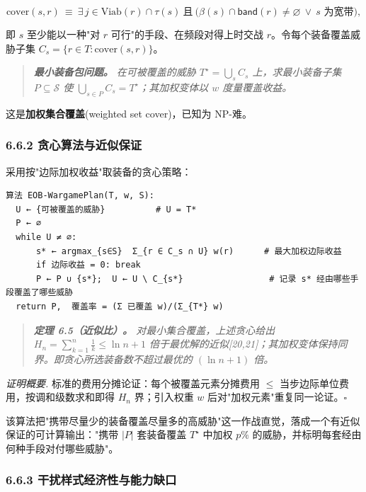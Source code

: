 \documentclass[12pt,a4paper]{ctexart}
\begin{document}
\[\mathrm{cover}(s,r)\ \equiv\ \exists\, j\in\mathrm{Viab}(r)\cap\tau(s)\ \text{且}\ \big(\beta(s)\cap\mathsf{band}(r)\ne\varnothing\ \lor\ s\text{ 为宽带}\big),\]

即 $s$ 至少能以一种"对 $r$ 可行"的手段、在频段对得上时交战 $r$。令每个装备覆盖威胁子集 $C_s=\{r\in T:\mathrm{cover}(s,r)\}$。

\begin{quote}\itshape \textbf{最小装备包问题。} 在可被覆盖的威胁 $T^\star=\bigcup_s C_s$ 上，求最小装备子集 $P\subseteq\mathcal{S}$ 使 $\bigcup_{s\in P}C_s=T^\star$；其加权变体以 $w$ 度量覆盖收益。\end{quote}

这是\textbf{加权集合覆盖}(weighted set cover)，已知为 NP-难。

\subsubsection*{6.6.2 贪心算法与近似保证}

采用按"边际加权收益"取装备的贪心策略：

\begin{Verbatim}
算法 EOB-WargamePlan(T, w, S):
  U ← {可被覆盖的威胁}          # U = T*
  P ← ∅
  while U ≠ ∅:
      s* ← argmax_{s∈S}  Σ_{r ∈ C_s ∩ U} w(r)      # 最大加权边际收益
      if 边际收益 = 0: break
      P ← P ∪ {s*};  U ← U \ C_{s*}                 # 记录 s* 经由哪些手段覆盖了哪些威胁
  return P,  覆盖率 = (Σ 已覆盖 w)/(Σ_{T*} w)
\end{Verbatim}

\begin{quote}\itshape \textbf{定理 6.5（近似比）。} 对最小集合覆盖，上述贪心给出 $H_n=\sum_{k=1}^{n}\frac1k\le \ln n+1$ 倍于最优解的近似[20,21]；其加权变体保持同界。即贪心所选装备数不超过最优的 $(\ln n+1)$ 倍。\end{quote}

\textit{证明概要.} 标准的费用分摊论证：每个被覆盖元素分摊费用 $\le$ 当步边际单位费用，按调和级数求和即得 $H_n$ 界；引入权重 $w$ 后对"加权元素"重复同一论证。$\square$

该算法把"携带尽量少的装备覆盖尽量多的高威胁"这一作战直觉，落成一个有近似保证的可计算输出："携带 $|P|$ 套装备覆盖 $T^\star$ 中加权 $p\%$ 的威胁，并标明每套经由何种手段对付哪些威胁"。

\subsubsection*{6.6.3 干扰样式经济性与能力缺口}
\end{document}
